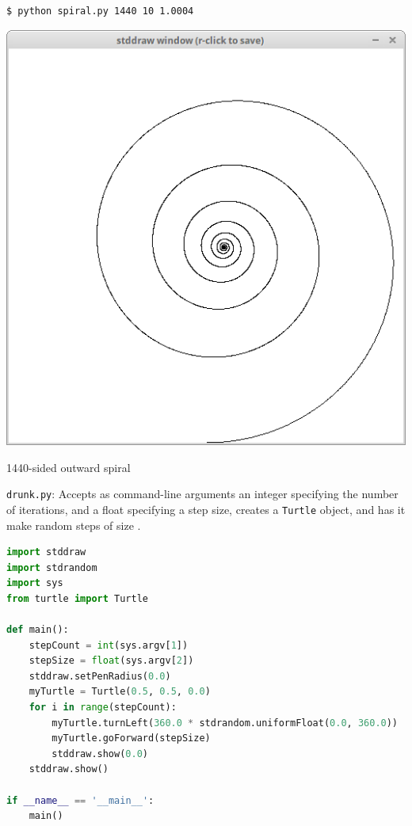 \documentclass[8pt,a4paper,compress,handout]{beamer}
\begin{document}
\begin{frame}[fragile]
\begin{minipage}{200pt}
\begin{lstlisting}[language={}]
$ python spiral.py 1440 10 1.0004
\end{lstlisting}
\end{minipage}%
\hfill
\begin{minipage}{100pt}
\begin{center}
\includegraphics[scale=0.2]{figures/spiral2.png}

\smallskip

\tiny 1440-sided outward spiral
\end{center}
\end{minipage}
\end{frame}

\begin{frame}[fragile]
\begin{framed}
\tiny \lstinline{drunk.py}: Accepts as command-line arguments an integer  specifying the number of iterations, and a float  specifying a step size, creates a \lstinline{Turtle} object, and has it make  random steps of size .
\end{framed}

\begin{lstlisting}[language=Python]
import stddraw
import stdrandom
import sys
from turtle import Turtle

def main():
    stepCount = int(sys.argv[1])
    stepSize = float(sys.argv[2])
    stddraw.setPenRadius(0.0)
    myTurtle = Turtle(0.5, 0.5, 0.0)
    for i in range(stepCount):
        myTurtle.turnLeft(360.0 * stdrandom.uniformFloat(0.0, 360.0))
        myTurtle.goForward(stepSize)
        stddraw.show(0.0)
    stddraw.show()

if __name__ == '__main__':
    main()
\end{lstlisting}
\end{frame}
\end{document}
